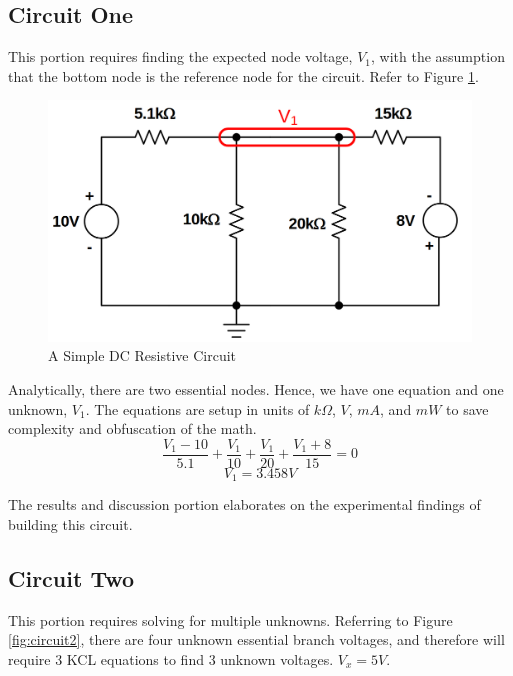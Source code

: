 \documentclass[12pt]{article}
\begin{document}
\subsection{Circuit One}
This portion requires finding the expected node voltage, $V_1$, with the
assumption that the bottom node is the reference node for the circuit. Refer to
Figure \ref{fig:circuit1}.
\begin{figure}[H]
	\centering
	\includegraphics[width=1\textwidth]{06_01}
	\caption{A Simple DC Resistive Circuit}
	\label{fig:circuit1}
\end{figure}
Analytically, there are two essential nodes. Hence, we have one equation and one
unknown, $V_1$.
The equations are setup in units of $k\Omega$, $V$, $mA$, and $mW$ to save
complexity and obfuscation of the math.
\[
	\frac{V_1 - 10}{5.1} + \frac{V_1}{10} + \frac{V_1}{20} + \frac{V_1 + 8}{15} =
	0
\]
\[	V_1 = 3.458 V\]

The results and discussion portion elaborates on the experimental findings of
building this circuit.
\subsection{Circuit Two}
This portion requires solving for multiple unknowns. Referring to Figure
\ref{fig:circuit2}, there are four unknown essential branch voltages, and
therefore will require 3 KCL equations to find 3 unknown voltages. $V_x = 5V$.
\end{document}
